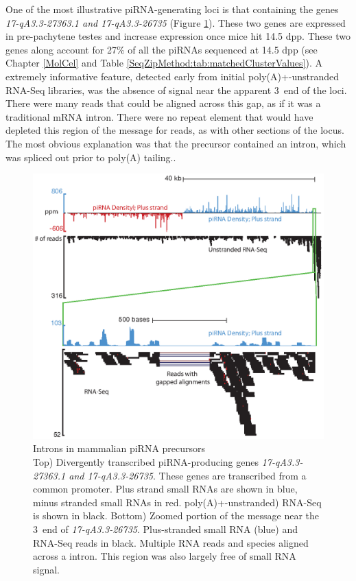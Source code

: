   One of the most illustrative piRNA-generating loci is that containing the genes \textit{17-qA3.3-27363.1 and 17-qA3.3-26735} (Figure \ref{SeqZipMethod:fig:no piRNAs within Precursor Introns}). These two genes are expressed in pre-pachytene testes and increase expression once mice hit 14.5 dpp. These two genes along account for 27\% of all the piRNAs sequenced at 14.5 dpp (see Chapter \ref{MolCel} and Table \ref{SeqZipMethod:tab:matchedClusterValues}). A extremely informative feature, detected early from initial poly(A)+-unstranded RNA-Seq libraries, was the absence of signal near the apparent 3\textprime~end of the loci. There were many reads that could be aligned across this gap, as if it was a traditional mRNA intron. There were no repeat element that would have depleted this region of the message for reads, as with other sections of the locus. The most obvious explanation was that the precursor contained an intron, which was spliced out prior to poly(A) tailing..

  \begin{figure} %
    \centering 
    \includegraphics{Figures/SeqZipMethod/noPiRNAswithinPrecusorIntrons.eps}
    \caption[Introns in mammalian piRNA precursors]
    {
      Introns in mammalian piRNA precursors\\[0.25cm]
      Top) Divergently transcribed piRNA-producing genes \textit{17-qA3.3-27363.1 and 17-qA3.3-26735}. These genes are transcribed from a common promoter. Plus strand small RNAs are shown in blue, minus stranded small RNAs in red. poly(A)+-unstranded) RNA-Seq is shown in black. Bottom) Zoomed portion of the message near the 3\textprime~end of \textit{17-qA3.3-26735}. Plus-stranded small RNA (blue) and RNA-Seq reads in black. Multiple RNA reads and species aligned across a intron. This region was also largely free of small RNA signal.
      }
    \label{SeqZipMethod:fig:no piRNAs within Precursor Introns}
    \end{figure}

